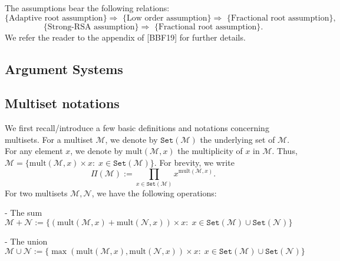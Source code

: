\documentclass[11pt, lettersize, notitlepage, leqno, footskip=0.6cm]{article}
\newcommand{\pl}{\prod\limits}
\newcommand{\ttt}{\texttt}
\newcommand{\sett}{\ttt{Set}}
\newcommand{\mult}{\mr{mult}}
\newcommand{\mul}{\mr{mult}}
\newcommand{\imp}{\Longrightarrow}
\newcommand{\mc}{\mathcal}
\newcommand{\mr}{\mathrm}
\newcommand{\vs}{\vspace{-0.15cm}}
\newcommand{\noin}{\noindent}
\newtheorem{Def}{Definition}[section]
\numberwithin{equation}{section}
\begin{document}
\noin The assumptions bear the following relations: \vs $$\text{\{Adaptive root assumption\} }\imp \text{ \{Low order assumption\} } \imp \text{ \{Fractional root assumption\} },$$ \vspace{-0.6cm} $$\text{\{Strong-RSA assumption\} }\imp \text{ \{Fractional root assumption\}}. $$ We refer the reader to the appendix of [BBF19] for further details.

\subsection{\fontsize{11}{11}\selectfont Argument Systems }
\begin{comment}

\begin{Def} \normalfont We say an argument system $\protect{(\verb|Pgen,;P,V|)}$ is \textit{sound} if for all PPT adversaries $\mc{A} = (\mc{A}_0, \mc{A}_1)$, the probability of $\mc{A}$ forging a fake proof is negligible.\end{Def}

\begin{Def} \normalfont An argument system is \textit{non-interactive} if it consists of a single round of interaction between the Prover and the Verifier.\end{Def}

\noin \textbf{This subsection needs to be completed}


\end{comment}


\subsection{\fontsize{11}{11}\selectfont Multiset notations}


We first recall/introduce a few basic definitions and notations concerning multisets. For a multiset $\mc{M}$, we denote by $\sett(\mc{M})$ the underlying set of $\mc{M}$. For any element $x$, we denote by $\mul(\mc{M},x)$ the multiplicity of $x$ in $\mc{M}$. Thus, $\mc{M} = \{ \mult(\mc{M},x)\times x: \; x\in \sett(\mc{M})\}$. For brevity, we write \vs $$\Pi(\mc{M}):= \pl_{x\in \sett(\mc{M})} x^{\mult(\mc{M},x)}.$$ For two multisets $\mc{M}, \mc{N}$, we have the following operations:\vspace{0.1cm}

\noin - The sum $\mc{M}+\mc{N} := \{(\mul(\mc{M},x)+\mul(\mc{N},x))\times x:\;x\in \sett(\mc{M})\cup\sett(\mc{N}) \}$

\noin - The union $\mc{M}\cup \mc{N} := \{\max(\mul(\mc{M},x),\mul(\mc{N},x))\times x:\;x\in \sett(\mc{M})\cup\sett(\mc{N})\}$
\end{document}
